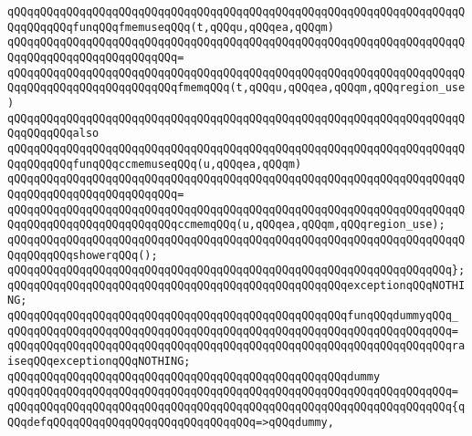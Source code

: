 \verb|qQQqqQQqqQQqqQQqqQQqqQQqqQQqqQQqqQQqqQQqqQQqqQQqqQQqqQQqqQQqqQQqqQQqqQQqqQQqqQQqfunqQQqfmemuseqQQq(t,qQQqu,qQQqea,qQQqm)|\newline
\verb|qQQqqQQqqQQqqQQqqQQqqQQqqQQqqQQqqQQqqQQqqQQqqQQqqQQqqQQqqQQqqQQqqQQqqQQqqQQqqQQqqQQqqQQqqQQqqQQq=|\newline
\verb|qQQqqQQqqQQqqQQqqQQqqQQqqQQqqQQqqQQqqQQqqQQqqQQqqQQqqQQqqQQqqQQqqQQqqQQqqQQqqQQqqQQqqQQqqQQqqQQqfmemqQQq(t,qQQqu,qQQqea,qQQqm,qQQqregion_use)|\newline
\newline
\verb|qQQqqQQqqQQqqQQqqQQqqQQqqQQqqQQqqQQqqQQqqQQqqQQqqQQqqQQqqQQqqQQqqQQqqQQqqQQqqQQqalso|\newline
\verb|qQQqqQQqqQQqqQQqqQQqqQQqqQQqqQQqqQQqqQQqqQQqqQQqqQQqqQQqqQQqqQQqqQQqqQQqqQQqqQQqfunqQQqccmemuseqQQq(u,qQQqea,qQQqm)|\newline
\verb|qQQqqQQqqQQqqQQqqQQqqQQqqQQqqQQqqQQqqQQqqQQqqQQqqQQqqQQqqQQqqQQqqQQqqQQqqQQqqQQqqQQqqQQqqQQqqQQq=|\newline
\verb|qQQqqQQqqQQqqQQqqQQqqQQqqQQqqQQqqQQqqQQqqQQqqQQqqQQqqQQqqQQqqQQqqQQqqQQqqQQqqQQqqQQqqQQqqQQqqQQqccmemqQQq(u,qQQqea,qQQqm,qQQqregion_use);|\newline
\newline
\verb|qQQqqQQqqQQqqQQqqQQqqQQqqQQqqQQqqQQqqQQqqQQqqQQqqQQqqQQqqQQqqQQqqQQqqQQqqQQqqQQqshowerqQQq();|\newline
\verb|qQQqqQQqqQQqqQQqqQQqqQQqqQQqqQQqqQQqqQQqqQQqqQQqqQQqqQQqqQQqqQQqqQQq};|\newline
\newline
\verb|qQQqqQQqqQQqqQQqqQQqqQQqqQQqqQQqqQQqqQQqqQQqqQQqqQQqexceptionqQQqNOTHING;|\newline
\newline
\verb|qQQqqQQqqQQqqQQqqQQqqQQqqQQqqQQqqQQqqQQqqQQqqQQqqQQqfunqQQqdummyqQQq_|\newline
\verb|qQQqqQQqqQQqqQQqqQQqqQQqqQQqqQQqqQQqqQQqqQQqqQQqqQQqqQQqqQQqqQQqqQQq=|\newline
\verb|qQQqqQQqqQQqqQQqqQQqqQQqqQQqqQQqqQQqqQQqqQQqqQQqqQQqqQQqqQQqqQQqqQQqraiseqQQqexceptionqQQqNOTHING;|\newline
\newline
\verb|qQQqqQQqqQQqqQQqqQQqqQQqqQQqqQQqqQQqqQQqqQQqqQQqqQQqdummy|\newline
\verb|qQQqqQQqqQQqqQQqqQQqqQQqqQQqqQQqqQQqqQQqqQQqqQQqqQQqqQQqqQQqqQQqqQQq=|\newline
\verb|qQQqqQQqqQQqqQQqqQQqqQQqqQQqqQQqqQQqqQQqqQQqqQQqqQQqqQQqqQQqqQQqqQQq{qQQqdefqQQqqQQqqQQqqQQqqQQqqQQqqQQqqQQq=>qQQqdummy,|\newline
